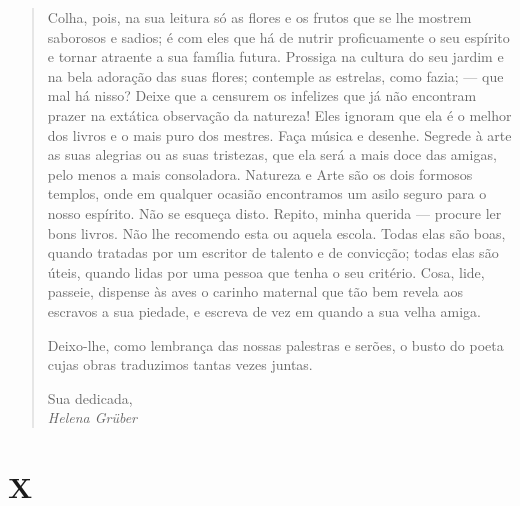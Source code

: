 {\begin{quote}
Colha, pois, na sua leitura só as flores e os frutos que se lhe
mostrem saborosos e sadios; é com eles que há de nutrir
proficuamente o seu espírito e tornar atraente a sua família
futura. Prossiga na cultura do seu jardim e na bela adoração
das suas flores; contemple as estrelas, como fazia; --- que mal
há nisso? Deixe que a censurem os infelizes que já não encontram
prazer na extática observação da natureza! Eles ignoram que ela é o
melhor dos livros e o mais puro dos mestres. Faça música e
desenhe. Segrede à arte as suas alegrias ou as suas tristezas, que ela
será a mais doce das amigas, pelo menos a mais consoladora. Natureza e
Arte são os dois formosos templos, onde em qualquer ocasião encontramos
um asilo seguro para o nosso espírito. Não se esqueça disto.
Repito, minha querida --- procure ler bons livros. Não lhe recomendo
esta ou aquela escola. Todas elas são boas, quando tratadas por um
escritor de talento e de convicção; todas elas são úteis, quando lidas
por uma pessoa que tenha o seu critério. Cosa, lide,
passeie, dispense às aves o carinho maternal que tão bem revela aos
escravos a sua piedade, e escreva de vez em quando a sua velha
amiga.

Deixo-lhe, como lembrança das nossas palestras e serões, o busto
do poeta cujas obras traduzimos tantas vezes juntas.

\begin{flushright}
Sua dedicada,\\
\emph{Helena Grüber}
\end{flushright}
\end{quote}


\section{X}



}
